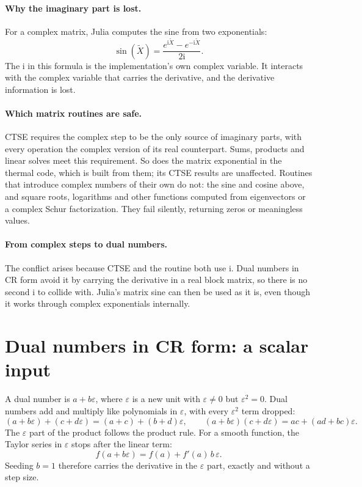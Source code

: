 \documentclass[11pt]{article}
\newcommand{\ii}{\mathrm i}
\begin{document}
\paragraph{Why the imaginary part is lost.}
For a complex matrix, Julia computes the sine from two exponentials:
\[
 \sin(\widetilde X)=\frac{e^{\ii\widetilde X}-e^{-\ii\widetilde X}}{2\ii}.
\]
The $\ii$ in this formula is the implementation's own complex variable. It
interacts with the complex variable that carries the derivative, and the
derivative information is lost.

\paragraph{Which matrix routines are safe.}
CTSE requires the complex step to be the only source of imaginary parts, with
every operation the complex version of its real counterpart. Sums, products
and linear solves meet this requirement. So does the matrix exponential in the
thermal code, which is built from them; its CTSE results are unaffected.
Routines that introduce complex numbers of their own do not: the sine and
cosine above, and square roots, logarithms and other functions computed from
eigenvectors or a complex Schur factorization. They fail silently, returning
zeros or meaningless values.

\paragraph{From complex steps to dual numbers.}
The conflict arises because CTSE and the routine both use $\ii$. Dual numbers
in CR form avoid it by carrying the derivative in a real block matrix, so
there is no second $\ii$ to collide with. Julia's matrix sine can then be used
as it is, even though it works through complex exponentials internally.

\section{Dual numbers in CR form: a scalar input}
A dual number is $a+b\varepsilon$, where $\varepsilon$ is a new unit with
$\varepsilon\neq0$ but $\varepsilon^2=0$. Dual numbers add and multiply like
polynomials in $\varepsilon$, with every $\varepsilon^2$ term dropped:
\[
 (a+b\varepsilon)+(c+d\varepsilon)=(a+c)+(b+d)\varepsilon,\qquad
 (a+b\varepsilon)(c+d\varepsilon)=ac+(ad+bc)\varepsilon.
\]
The $\varepsilon$ part of the product follows the product rule. For a smooth
function, the Taylor series in $\varepsilon$ stops after the linear term:
\[
 f(a+b\varepsilon)=f(a)+f'(a)\,b\,\varepsilon.
\]
Seeding $b=1$ therefore carries the derivative in the $\varepsilon$ part,
exactly and without a step size.
\end{document}
